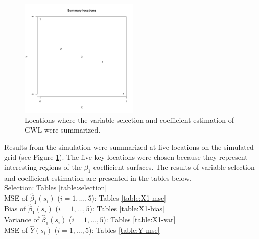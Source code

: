 \documentclass[authoryear, review, 11pt]{elsarticle}
\begin{document}
	\begin{figure}
		\begin{center}
			\includegraphics[width=0.5\textwidth]{../../figures/simulation/illustrations/summary-locations.pdf}
			\caption{Locations where the variable selection and coefficient estimation of GWL were summarized.\label{fig:summary-locations}}
		\end{center}
	\end{figure}
	
	
	Results from the simulation were summarized at five locations on the simulated grid (see Figure \ref{fig:summary-locations}). The five key locations were chosen because they represent interesting regions of the $\beta_1$ coefficient surfaces. The results of variable selection  and coefficient estimation  are presented in the tables below.\\	
	Selection: Tables \ref{table:selection}\\
	MSE of $\hat{\beta}_1(s_i)$ ($i = 1, \dots, 5$): Tables \ref{table:X1-mse}\\
	Bias of $\hat{\beta}_1(s_i)$ ($i = 1, \dots, 5$): Tables \ref{table:X1-bias}\\
	Variance of $\hat{\beta}_1(s_i)$ ($i = 1, \dots, 5$): Tables \ref{table:X1-var}\\
	MSE of $\hat{Y}(s_i)$ ($i = 1, \dots, 5$): Tables \ref{table:Y-mse}\\
	
	
		
\end{document}
